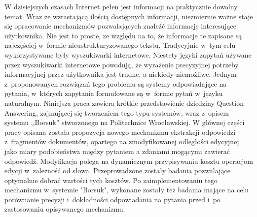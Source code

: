 \documentclass[a4paper, twoside, 12pt]{report}
\newenvironment{abstractpage}
  {\vspace*{\fill}\thispagestyle{empty}}
    {\vfill}
\renewenvironment{abstract}[1]
      {\bigskip\selectlanguage{#1}%
             \begin{center}\bfseries\abstractname\end{center}}
           {\par\bigskip}
\begin{document}



\begin{abstractpage}
\begin{abstract}{polish}
    W dzisiejszych czasach Internet pełen jest informacji na praktycznie dowolny temat. Wraz ze wzrastającą ilością
    dostępnych informacji, niezmiernie ważne staje się opracowanie mechanizmów pozwalających znaleźć informacje
    interesujące użytkownika. Nie jest to proste, ze względu na to, że informacje te zapisane są najczęściej w~formie
    nieustrukturyzowanego tekstu. Tradycyjnie w~tym celu wykorzystywane były wyszukiwarki internetowe. Niestety
    języki zapytań używane przez wyszukiwarki internetowe powodują, że wyrażenie precyzyjnej potrzeby informacyjnej
    przez użytkownika jest trudne, a niekiedy niemożliwe. Jednym z~proponowanych rozwiązań tego problemu są systemy
    odpowiadające na pytania, w~których zapytania formułowane są w~formie pytań w~języku naturalnym. Niniejsza
    praca zawiera krótkie przedstawienie dziedziny Question Answering, zajmującej się tworzeniem tego typu systemów,
    wraz z~opisem systemu ,,Borsuk'' stworzonego na Politechnice Wrocławskiej.
    W głównej części pracy opisana została propozycja nowego mechanizmu ekstrakcji odpowiedzi z~fragmentów dokumentów,
    opartego na zmodyfikowanej odległości edycyjnej jako miary podobieństwa między pytaniem a zdaniami mogącymi zawierać
    odpowiedź. Modyfikacja polega na dynamicznym przypisywaniu kosztu operacjom edycji w~zależność od słowa. Przeprowadzone
    zostały badania pozwalające optymalnie dobrać wartości tych kosztów. Po zaimplementowaniu tego mechanizmu w~systemie "Borsuk",
    wykonane zostały też badania mające na celu porównanie precyzji i~dokładności odpowiadania na pytania przed i~po
    zastosowaniu opisywanego mechanizmu.
\end{abstract}


\end{abstractpage}
\end{document}
